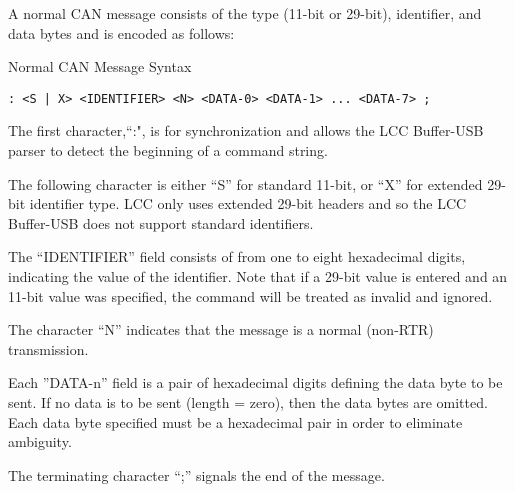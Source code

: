 A normal CAN message consists of the type (11-bit or 29-bit), identifier, and data bytes and is encoded as follows:

Normal CAN Message Syntax
\begin{verbatim}
: <S | X> <IDENTIFIER> <N> <DATA-0> <DATA-1> ... <DATA-7> ;
\end{verbatim}

The first character,``:", is for synchronization and allows the LCC Buffer-USB parser to detect the beginning of a command string.

The following character is either ``S'' for standard 11-bit, or ``X'' for extended 29-bit identifier type. LCC only uses extended 29-bit headers and so the LCC Buffer-USB does not support standard identifiers.

The ``IDENTIFIER'' field consists of from one to eight hexadecimal digits, indicating the value of the identifier. Note that if a 29-bit value is entered and an 11-bit value was specified, the command will be treated as invalid and ignored.

The character ``N'' indicates that the message is a normal (non-RTR) transmission.

Each ''DATA-n'' field is a pair of hexadecimal digits defining the data byte to be sent. If no data is to be sent (length = zero), then the data bytes are omitted. Each data byte specified must be a hexadecimal pair in order to eliminate ambiguity. 

The terminating character ``;'' signals the end of the message.

